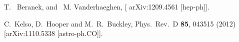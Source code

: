 T. ~Beranek, and ~M. Vanderhaeghen, [	arXiv:1209.4561 [hep-ph]].

  C.~Kelso, D.~Hooper and M.~R.~Buckley,
  Phys.\ Rev.\ D {\bf 85}, 043515 (2012)
  [arXiv:1110.5338 [astro-ph.CO]].



